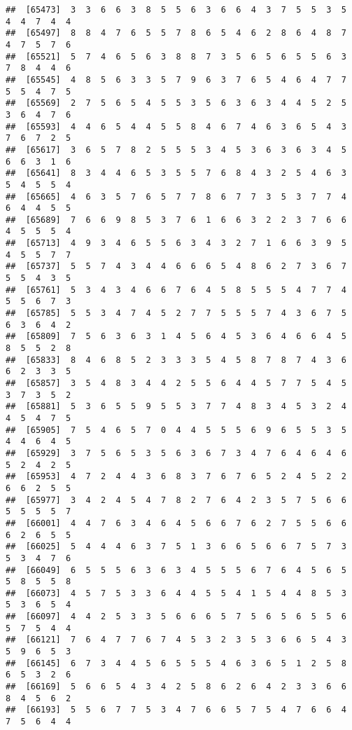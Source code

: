 \documentclass[
]{book}
\begin{document}
\begin{verbatim}
##  [65473]  3  3  6  6  3  8  5  5  6  3  6  6  4  3  7  5  5  3  5  4  4  7  4  4
##  [65497]  8  8  4  7  6  5  5  7  8  6  5  4  6  2  8  6  4  8  7  4  7  5  7  6
##  [65521]  5  7  4  6  5  6  3  8  8  7  3  5  6  5  6  5  5  6  3  7  8  4  4  6
##  [65545]  4  8  5  6  3  3  5  7  9  6  3  7  6  5  4  6  4  7  7  5  5  4  7  5
##  [65569]  2  7  5  6  5  4  5  5  3  5  6  3  6  3  4  4  5  2  5  3  6  4  7  6
##  [65593]  4  4  6  5  4  4  5  5  8  4  6  7  4  6  3  6  5  4  3  7  6  7  2  5
##  [65617]  3  6  5  7  8  2  5  5  5  3  4  5  3  6  3  6  3  4  5  6  6  3  1  6
##  [65641]  8  3  4  4  6  5  3  5  5  7  6  8  4  3  2  5  4  6  3  5  4  5  5  4
##  [65665]  4  6  3  5  7  6  5  7  7  8  6  7  7  3  5  3  7  7  4  6  4  4  5  5
##  [65689]  7  6  6  9  8  5  3  7  6  1  6  6  3  2  2  3  7  6  6  4  5  5  5  4
##  [65713]  4  9  3  4  6  5  5  6  3  4  3  2  7  1  6  6  3  9  5  4  5  5  7  7
##  [65737]  5  5  7  4  3  4  4  6  6  6  5  4  8  6  2  7  3  6  7  5  5  4  3  5
##  [65761]  5  3  4  3  4  6  6  7  6  4  5  8  5  5  5  4  7  7  4  5  5  6  7  3
##  [65785]  5  5  3  4  7  4  5  2  7  7  5  5  5  7  4  3  6  7  5  6  3  6  4  2
##  [65809]  7  5  6  3  6  3  1  4  5  6  4  5  3  6  4  6  6  4  5  8  5  5  2  8
##  [65833]  8  4  6  8  5  2  3  3  3  5  4  5  8  7  8  7  4  3  6  6  2  3  3  5
##  [65857]  3  5  4  8  3  4  4  2  5  5  6  4  4  5  7  7  5  4  5  3  7  3  5  2
##  [65881]  5  3  6  5  5  9  5  5  3  7  7  4  8  3  4  5  3  2  4  4  5  4  7  5
##  [65905]  7  5  4  6  5  7  0  4  4  5  5  5  6  9  6  5  5  3  5  4  4  6  4  5
##  [65929]  3  7  5  6  5  3  5  6  3  6  7  3  4  7  6  4  6  4  6  5  2  4  2  5
##  [65953]  4  7  2  4  4  3  6  8  3  7  6  7  6  5  2  4  5  2  2  6  6  2  5  5
##  [65977]  3  4  2  4  5  4  7  8  2  7  6  4  2  3  5  7  5  6  6  5  5  5  5  7
##  [66001]  4  4  7  6  3  4  6  4  5  6  6  7  6  2  7  5  5  6  6  6  2  6  5  5
##  [66025]  5  4  4  4  6  3  7  5  1  3  6  6  5  6  6  7  5  7  3  5  3  4  7  6
##  [66049]  6  5  5  5  6  3  6  3  4  5  5  5  6  7  6  4  5  6  5  5  8  5  5  8
##  [66073]  4  5  7  5  3  3  6  4  4  5  5  4  1  5  4  4  8  5  3  5  3  6  5  4
##  [66097]  4  4  2  5  3  3  5  6  6  6  5  7  5  6  5  6  5  5  6  5  7  5  4  4
##  [66121]  7  6  4  7  7  6  7  4  5  3  2  3  5  3  6  6  5  4  3  5  9  6  5  3
##  [66145]  6  7  3  4  4  5  6  5  5  5  4  6  3  6  5  1  2  5  8  6  5  3  2  6
##  [66169]  5  6  6  5  4  3  4  2  5  8  6  2  6  4  2  3  3  6  6  8  4  5  6  2
##  [66193]  5  5  6  7  7  5  3  4  7  6  6  5  7  5  4  7  6  6  4  7  5  6  4  4

\end{verbatim}
\end{document}
